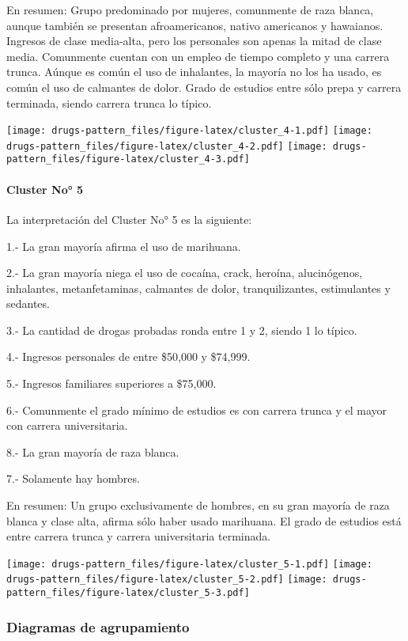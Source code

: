 \documentclass[]{article}
\let\oldparagraph\paragraph
\renewcommand{\paragraph}[1]{\oldparagraph{#1}\mbox{}}
\begin{document}
En resumen: Grupo predominado por mujeres, comunmente de raza blanca,
aunque también se presentan afroamericanos, nativo americanos y
hawaianos. Ingresos de clase media-alta, pero los personales son apenas
la mitad de clase media. Comunmente cuentan con un empleo de tiempo
completo y una carrera trunca. Aúnque es común el uso de inhalantes, la
mayoría no los ha usado, es común el uso de calmantes de dolor. Grado de
estudios entre sólo prepa y carrera terminada, siendo carrera trunca lo
típico.

\texttt{[image: drugs-pattern\_files/figure-latex/cluster\_4-1.pdf]}
\texttt{[image: drugs-pattern\_files/figure-latex/cluster\_4-2.pdf]}
\texttt{[image: drugs-pattern\_files/figure-latex/cluster\_4-3.pdf]}

\paragraph{Cluster No° 5}\label{cluster-no-5}

La interpretación del Cluster No° 5 es la siguiente:

1.- La gran mayoría afirma el uso de marihuana.

2.- La gran mayoría niega el uso de cocaína, crack, heroína,
alucinógenos, inhalantes, metanfetaminas, calmantes de dolor,
tranquilizantes, estimulantes y sedantes.

3.- La cantidad de drogas probadas ronda entre 1 y 2, siendo 1 lo
típico.

4.- Ingresos personales de entre \$50,000 y \$74,999.

5.- Ingresos familiares superiores a \$75,000.

6.- Comunmente el grado mínimo de estudios es con carrera trunca y el
mayor con carrera universitaria.

8.- La gran mayoría de raza blanca.

7.- Solamente hay hombres.

En resumen: Un grupo exclusivamente de hombres, en su gran mayoría de
raza blanca y clase alta, afirma sólo haber usado marihuana. El grado de
estudios está entre carrera trunca y carrera universitaria terminada.

\texttt{[image: drugs-pattern\_files/figure-latex/cluster\_5-1.pdf]}
\texttt{[image: drugs-pattern\_files/figure-latex/cluster\_5-2.pdf]}
\texttt{[image: drugs-pattern\_files/figure-latex/cluster\_5-3.pdf]}

\subsubsection{Diagramas de
agrupamiento}\label{diagramas-de-agrupamiento}
\end{document}
